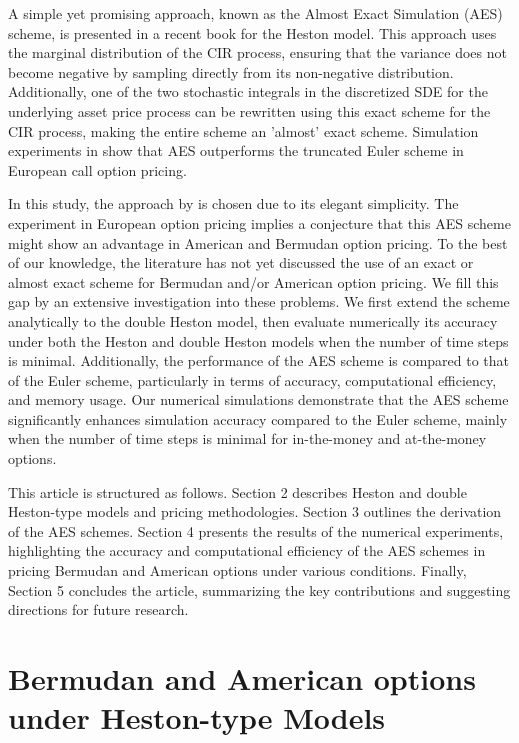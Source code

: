 \documentclass[]{interact}
\theoremstyle{plain}%
\theoremstyle{definition}
\theoremstyle{remark}
\begin{document}
A simple yet promising approach, known as the Almost Exact Simulation (AES) scheme, is presented in a recent book \cite{oosterlee2019mathematical} for the Heston model. This approach uses the marginal distribution of the CIR process, ensuring that the variance does not become negative by sampling directly from its non-negative distribution. Additionally, one of the two stochastic integrals in the discretized SDE for the underlying asset price process can be rewritten using this exact scheme for the CIR process, making the entire scheme an 'almost' exact scheme. Simulation experiments in \cite{oosterlee2019mathematical} show that AES outperforms the truncated Euler scheme in European call option pricing. 

In this study, the approach by \cite{oosterlee2019mathematical} is chosen due to its elegant simplicity. The experiment in European option pricing implies a conjecture that this AES scheme might show an advantage in American and Bermudan option pricing. To the best of our knowledge, the literature has not yet discussed the use of an exact or almost exact scheme for Bermudan and/or American option pricing. We fill this gap by an extensive investigation into these problems. We first extend the scheme analytically to the double Heston model, then evaluate numerically its accuracy under both the Heston and double Heston models when the number of time steps is minimal. Additionally, the performance of the AES scheme is compared to that of the Euler scheme, particularly in terms of accuracy, computational efficiency, and memory usage. Our numerical simulations demonstrate that the AES scheme significantly enhances simulation accuracy compared to the Euler scheme, mainly when the number of time steps is minimal for in-the-money and at-the-money options.

This article is structured as follows. Section 2 describes Heston and double Heston-type models and pricing methodologies. Section 3 outlines the derivation of the AES schemes. Section 4 presents the results of the numerical experiments, highlighting the accuracy and computational efficiency of the AES schemes in pricing Bermudan and American options under various conditions. Finally, Section 5 concludes the article, summarizing the key contributions and suggesting directions for future research.





\section{Bermudan and American options under Heston-type Models}
\end{document}
